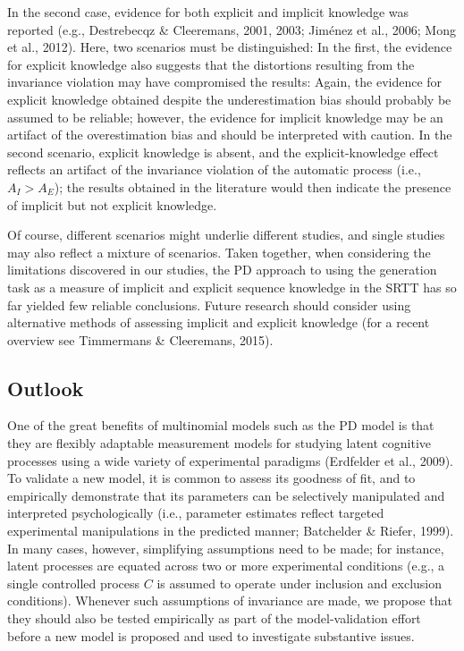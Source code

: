 \documentclass[floatsintext,man]{apa6}
\begin{document}
In the second case, evidence for both explicit and implicit knowledge
was reported (e.g., Destrebecqz \& Cleeremans, 2001, 2003; Jiménez et
al., 2006; Mong et al., 2012). Here, two scenarios must be
distinguished: In the first, the evidence for explicit knowledge also
suggests that the distortions resulting from the invariance violation
may have compromised the results: Again, the evidence for explicit
knowledge obtained despite the underestimation bias should probably be
assumed to be reliable; however, the evidence for implicit knowledge may
be an artifact of the overestimation bias and should be interpreted with
caution. In the second scenario, explicit knowledge is absent, and the
explicit-knowledge effect reflects an artifact of the invariance
violation of the automatic process (i.e., \(A_{I} > A_{E}\)); the
results obtained in the literature would then indicate the presence of
implicit but not explicit knowledge.

Of course, different scenarios might underlie different studies, and
single studies may also reflect a mixture of scenarios. Taken together,
when considering the limitations discovered in our studies, the PD
approach to using the generation task as a measure of implicit and
explicit sequence knowledge in the SRTT has so far yielded few reliable
conclusions. Future research should consider using alternative methods
of assessing implicit and explicit knowledge (for a recent overview see
Timmermans \& Cleeremans, 2015).

\subsection{Outlook}\label{outlook}

One of the great benefits of multinomial models such as the PD model is
that they are flexibly adaptable measurement models for studying latent
cognitive processes using a wide variety of experimental paradigms
(Erdfelder et al., 2009). To validate a new model, it is common to
assess its goodness of fit, and to empirically demonstrate that its
parameters can be selectively manipulated and interpreted
psychologically (i.e., parameter estimates reflect targeted experimental
manipulations in the predicted manner; Batchelder \& Riefer, 1999). In
many cases, however, simplifying assumptions need to be made; for
instance, latent processes are equated across two or more experimental
conditions (e.g., a single controlled process \(C\) is assumed to
operate under inclusion and exclusion conditions). Whenever such
assumptions of invariance are made, we propose that they should also be
tested empirically as part of the model-validation effort before a new
model is proposed and used to investigate substantive issues.
\end{document}
